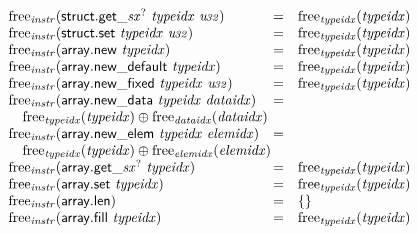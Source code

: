 $$\begin{array}[t]{@{}lcl@{}l@{}}
{\mathrm{free}}_{\mathit{instr}}({\mathsf{struct{.}get}}{\mathsf{\_}}{{{\mathit{sx}}^?}}~{\mathit{typeidx}}~{\mathit{u{\kern-0.1em\scriptstyle 32}}}) & = & {\mathrm{free}}_{\mathit{typeidx}}({\mathit{typeidx}}) \\
{\mathrm{free}}_{\mathit{instr}}(\mathsf{struct{.}set}~{\mathit{typeidx}}~{\mathit{u{\kern-0.1em\scriptstyle 32}}}) & = & {\mathrm{free}}_{\mathit{typeidx}}({\mathit{typeidx}}) \\
{\mathrm{free}}_{\mathit{instr}}(\mathsf{array{.}new}~{\mathit{typeidx}}) & = & {\mathrm{free}}_{\mathit{typeidx}}({\mathit{typeidx}}) \\
{\mathrm{free}}_{\mathit{instr}}(\mathsf{array{.}new\_default}~{\mathit{typeidx}}) & = & {\mathrm{free}}_{\mathit{typeidx}}({\mathit{typeidx}}) \\
{\mathrm{free}}_{\mathit{instr}}(\mathsf{array{.}new\_fixed}~{\mathit{typeidx}}~{\mathit{u{\kern-0.1em\scriptstyle 32}}}) & = & {\mathrm{free}}_{\mathit{typeidx}}({\mathit{typeidx}}) \\
{\mathrm{free}}_{\mathit{instr}}(\mathsf{array{.}new\_data}~{\mathit{typeidx}}~{\mathit{dataidx}}) & = & & \\
 \multicolumn{4}{@{}l@{}}{\quad
\begin{array}[t]{@{}l@{}}
{\mathrm{free}}_{\mathit{typeidx}}({\mathit{typeidx}}) \oplus {\mathrm{free}}_{\mathit{dataidx}}({\mathit{dataidx}}) \\
\end{array}
} \\
{\mathrm{free}}_{\mathit{instr}}(\mathsf{array{.}new\_elem}~{\mathit{typeidx}}~{\mathit{elemidx}}) & = & & \\
 \multicolumn{4}{@{}l@{}}{\quad
\begin{array}[t]{@{}l@{}}
{\mathrm{free}}_{\mathit{typeidx}}({\mathit{typeidx}}) \oplus {\mathrm{free}}_{\mathit{elemidx}}({\mathit{elemidx}}) \\
\end{array}
} \\
{\mathrm{free}}_{\mathit{instr}}({\mathsf{array{.}get}}{\mathsf{\_}}{{{\mathit{sx}}^?}}~{\mathit{typeidx}}) & = & {\mathrm{free}}_{\mathit{typeidx}}({\mathit{typeidx}}) \\
{\mathrm{free}}_{\mathit{instr}}(\mathsf{array{.}set}~{\mathit{typeidx}}) & = & {\mathrm{free}}_{\mathit{typeidx}}({\mathit{typeidx}}) \\
{\mathrm{free}}_{\mathit{instr}}(\mathsf{array{.}len}) & = & \{  \} \\
{\mathrm{free}}_{\mathit{instr}}(\mathsf{array{.}fill}~{\mathit{typeidx}}) & = & {\mathrm{free}}_{\mathit{typeidx}}({\mathit{typeidx}}) \\

\end{array}$$
